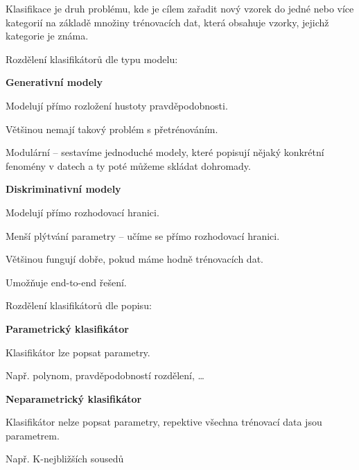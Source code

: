 \begin{compactitem}
    \item Klasifikace je druh problému, kde je cílem zařadit nový vzorek do jedné nebo více kategorií na základě množiny trénovacích dat, která obsahuje vzorky, jejichž kategorie je známa.

    \item Rozdělení klasifikátorů dle typu modelu: \begin{compactitem}
        \item \textbf{Generativní modely} \begin{compactitem}
            \item Modelují přímo rozložení hustoty pravděpodobnosti.
            \item Většinou nemají takový problém s přetrénováním.
            \item Modulární -- sestavíme jednoduché modely, které popisují nějaký konkrétní fenomény v datech a ty poté můžeme skládat dohromady.
        \end{compactitem}

        \item \textbf{Diskriminativní modely} \begin{compactitem}
            \item Modelují přímo rozhodovací hranici.
            \item Menší plýtvání parametry -- učíme se přímo rozhodovací hranici.
            \item Většinou fungují dobře, pokud máme hodně trénovacích dat.
            \item Umožňuje end-to-end řešení.
        \end{compactitem}
    \end{compactitem}

    \item Rozdělení klasifikátorů dle popisu: \begin{compactitem}
        \item \textbf{Parametrický klasifikátor} \begin{compactitem}
            \item Klasifikátor lze popsat parametry.
            \item Např. polynom, pravděpodobností rozdělení, \dots
        \end{compactitem}

        \item \textbf{Neparametrický klasifikátor} \begin{compactitem}
            \item Klasifikátor nelze popsat parametry, repektive všechna trénovací data jsou parametrem.
            \item Např. K-nejbližších sousedů
        \end{compactitem}
    \end{compactitem}
\end{compactitem}

